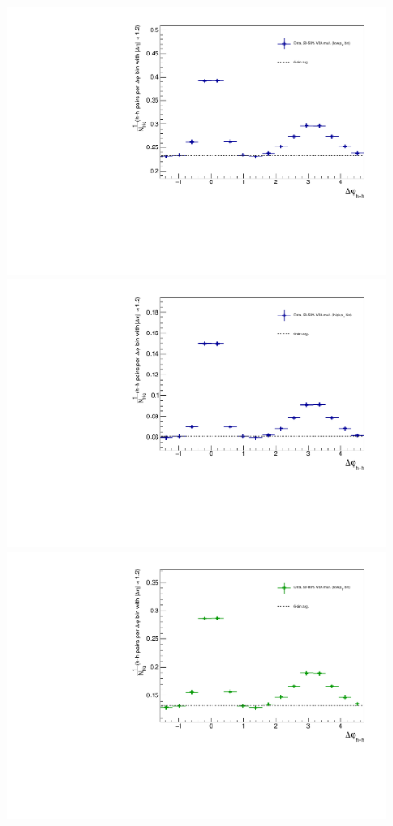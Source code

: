 \begin{figure}[ht]
\begin{minipage}{0.48\textwidth}
	\end{minipage}
	\begin{minipage}{0.48\textwidth}
		\includegraphics[width=\textwidth]{figures/analysis/h_h_dphi_avg6_20_50_lowpt.pdf}
	\end{minipage}
	\begin{minipage}{0.48\textwidth}
		\includegraphics[width=\textwidth]{figures/analysis/h_h_dphi_avg6_20_50_highpt.pdf}
	\end{minipage}
	\begin{minipage}{0.48\textwidth}
		\includegraphics[width=\textwidth]{figures/analysis/h_h_dphi_avg6_50_80_lowpt.pdf}

\end{minipage}
\end{figure}
